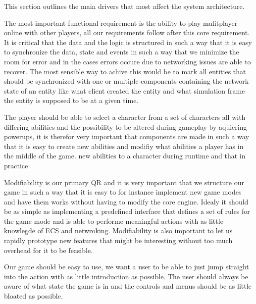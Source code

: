 	This section outlines the main drivers that most affect the system architecture.

	The most important functional requirement is the ability to play mulitplayer online with other 
	players, all our requirements follow after this core requirement. It is critical that the data and the logic is
	structured in such a way that it is easy to synchronize the data, state and events in such a way that we minimize the room for error
	and in the cases errors occure due to networking issues are able to recover. The most sensible way to achive this would be to mark all entities
	that should be synchronized with one or multiple components containing the network state of an entity like what client created the entity and what simulation
	frame the entity is supposed to be at a given time.

	The player should be able to select a character from a set of characters all with differing abilities and the possibility to be altered during gameplay
	by aquiering powerups, it is therefor very important that components are made in such a way that it is easy to create new abilities and modifiy
	what abilities a player has in the middle of the game. new abilities to a character during runtime and that in practice 

	Modifiability is our primary QR and it is very important that we structure our game in such a way that it is easy to for instance implement new game modes and have them works without
	having to modify the core engine. Idealy it should be as simple as implementing a predefined interface that defines a set of rules for the game mode and is able to performe meaningful actions with as little
	knowlegde of ECS and netwroking. Modifiability is also important to let us rapidly prototype new features that might be interesting without too much overhead for it to be feasible.
	
	Our game should be easy to use, we want a user to be able to just jump straight into the action with as little introduction as possible. The user should always be aware of what state
	the game is in and the controls and menus should be as little bloated as possible.
	
